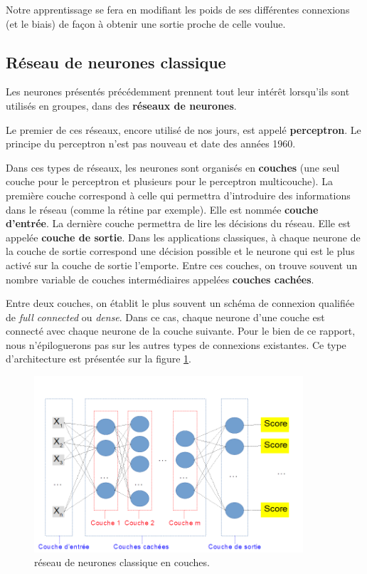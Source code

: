 Notre apprentissage se fera en modifiant les poids de ses différentes
connexions (et le biais) de façon à obtenir une sortie proche de celle voulue.

\hypertarget{Ruxe9seau-de-neurones-classique}{%
\subsection{Réseau de neurones classique}
\label{Ruxe9seau-de-neurones-classique}}

Les neurones présentés précédemment prennent tout leur intérêt lorsqu'ils sont utilisés en groupes, dans des \textbf{réseaux de neurones}.

Le premier de ces réseaux, encore utilisé de nos jours, est appelé \textbf{perceptron}.
Le principe du perceptron n'est pas nouveau et date des années 1960.

Dans ces types de réseaux, les neurones sont organisés en \textbf{couches} (une seul couche pour le perceptron et plusieurs pour le perceptron multicouche).
La première couche correspond à celle qui permettra d'introduire des informations dans le réseau (comme la rétine par exemple). Elle est nommée \textbf{couche d'entrée}.
La dernière couche permettra de lire les décisions du réseau. Elle est appelée \textbf{couche de sortie}. Dans les applications classiques, à chaque neurone de la couche de sortie correspond une décision possible et le neurone qui est le plus activé sur la couche de sortie l'emporte.
Entre ces couches, on trouve souvent un nombre variable de couches intermédiaires appelées \textbf{couches cachées}.

Entre deux couches, on établit le plus souvent un schéma de connexion qualifiée
de \textit{full connected} ou \textit{dense}.
Dans ce cas, chaque neurone d'une couche est connecté avec chaque neurone de la
couche suivante. Pour le bien de ce rapport, nous n'épiloguerons pas sur les autres
types de connexions existantes. Ce type d'architecture est présentée sur la figure \ref{reseauClassique}.

\begin{figure}[h]
\centering
\includegraphics[width=10cm]{./images/multicouche.png}
\caption{réseau de neurones classique en couches.%
\label{reseauClassique}}
\end{figure}


